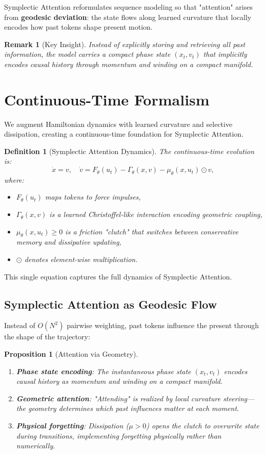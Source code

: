 \documentclass[12pt,letterpaper,twoside]{article}
\newtheorem{definition}{Definition}[section]
\newtheorem{remarque}{Remark}[section]
\newtheorem{prop}{Proposition}[section]
\begin{document}
Symplectic Attention reformulates sequence modeling so that "attention" arises from \textbf{geodesic deviation}: the state flows along learned curvature that locally encodes how past tokens shape present motion.

\begin{remarque}[Key Insight]
Instead of explicitly storing and retrieving all past information, the model carries a compact phase state $(x_t, v_t)$ that implicitly encodes causal history through momentum and winding on a compact manifold.
\end{remarque}

\section{Continuous-Time Formalism}

We augment Hamiltonian dynamics with learned curvature and selective dissipation, creating a continuous-time foundation for Symplectic Attention.

\begin{definition}[Symplectic Attention Dynamics]
The continuous-time evolution is:
\[
\dot{x} = v, \quad \dot{v} = F_\theta(u_t) - \Gamma_\theta(x, v) - \mu_\theta(x, u_t) \odot v,
\]
where:
\begin{itemize}
\item $F_\theta(u_t)$ maps tokens to force impulses,
\item $\Gamma_\theta(x, v)$ is a learned Christoffel-like interaction encoding geometric coupling,
\item $\mu_\theta(x, u_t) \geq 0$ is a friction "clutch" that switches between conservative memory and dissipative updating,
\item $\odot$ denotes element-wise multiplication.
\end{itemize}
\end{definition}

This single equation captures the full dynamics of Symplectic Attention.

\subsection{Symplectic Attention as Geodesic Flow}

Instead of $O(N^2)$ pairwise weighting, past tokens influence the present through the shape of the trajectory:

\begin{prop}[Attention via Geometry]
\begin{enumerate}
\item \textbf{Phase state encoding}: The instantaneous phase state $(x_t, v_t)$ encodes causal history as momentum and winding on a compact manifold.
\item \textbf{Geometric attention}: "Attending" is realized by local curvature steering—the geometry determines which past influences matter at each moment.
\item \textbf{Physical forgetting}: Dissipation ($\mu > 0$) opens the clutch to overwrite state during transitions, implementing forgetting physically rather than numerically.
\end{enumerate}
\end{prop}
\end{document}
